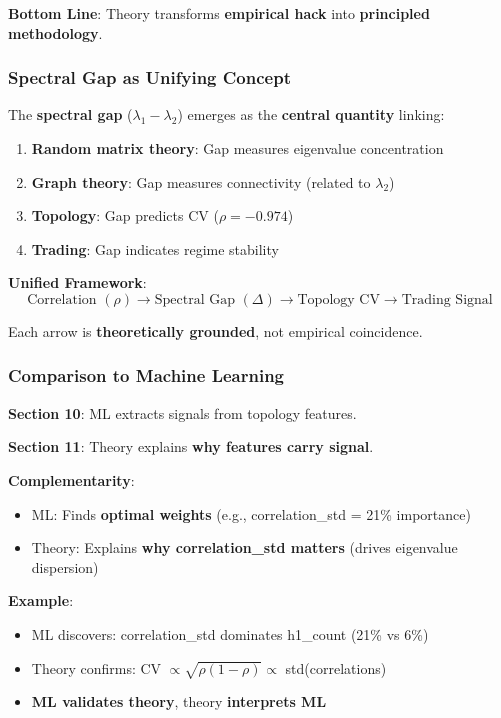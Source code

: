 \textbf{Bottom Line}: Theory transforms \textbf{empirical hack} into \textbf{principled methodology}.

\subsubsection{Spectral Gap as Unifying Concept}

The \textbf{spectral gap} ($\lambda_1 - \lambda_2$) emerges as the \textbf{central quantity} linking:

\begin{enumerate}
\item \textbf{Random matrix theory}: Gap measures eigenvalue concentration
\item \textbf{Graph theory}: Gap measures connectivity (related to $\lambda_2$)
\item \textbf{Topology}: Gap predicts CV ($\rho = -0.974$)
\item \textbf{Trading}: Gap indicates regime stability
\end{enumerate}

\textbf{Unified Framework}:
\begin{equation*}
\text{Correlation } (\rho) \rightarrow \text{Spectral Gap } (\Delta) \rightarrow \text{Topology CV} \rightarrow \text{Trading Signal}
\end{equation*}

Each arrow is \textbf{theoretically grounded}, not empirical coincidence.

\subsubsection{Comparison to Machine Learning}

\textbf{Section 10}: ML extracts signals from topology features.

\textbf{Section 11}: Theory explains \textbf{why features carry signal}.

\textbf{Complementarity}:
\begin{itemize}
\item ML: Finds \textbf{optimal weights} (e.g., correlation\_std = 21\% importance)
\item Theory: Explains \textbf{why correlation\_std matters} (drives eigenvalue dispersion)
\end{itemize}

\textbf{Example}:
\begin{itemize}
\item ML discovers: correlation\_std dominates h1\_count (21\% vs 6\%)
\item Theory confirms: CV $\propto \sqrt{\rho(1-\rho)} \propto$ std(correlations)
\item \textbf{ML validates theory}, theory \textbf{interprets ML}
\end{itemize}

